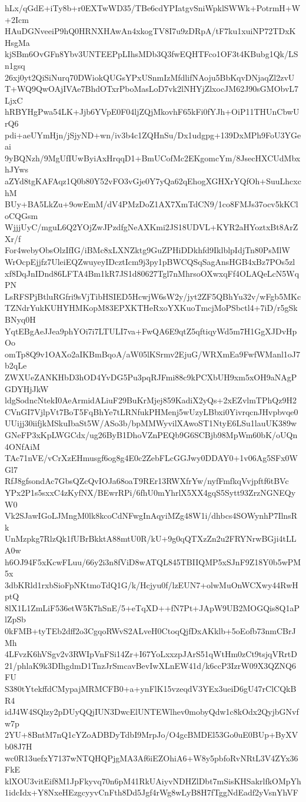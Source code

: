 hLx/qGdE+iTy8b+r0EXTwWD35/TBe6cdYPIatgvSniWpklSWWk+PotrmH+W+2Icm
HAuDGNveeiP9hQ0HRNXHAwAn4xkogTV8I7u9zDRpA/tF7ku1xuiNP72TDxKHsgMa
kjSBm6OvGFn8Ybv3UNTEEPpLIhsMDb3Q3fwEQHTFco1OF3t4KBubg1Qk/LSn1gsq
26xj0yt2QiSiNurq70DWiokQUGsYPxUSnmIzMfdlifNAoju5BbKqvDNjaqZl2zvU
T+WQ9QwOAjIVAe7BhdOTxrPboMasLoD7vk2lNHYjZlxocJM62J90sGMObvL7LjxC
hRBYHgPwa54LK+Jjb6YVpE0F04ljZQjMkovhF65kFi0fYJh+OiP11THUnCbwUrQ6
pdi+aeUYmHjn/jSjyND+wn/iv3b4c1ZQHnSu/Dx1udgpg+139DxMPh9FoU3YGeai
9yBQNzh/9MgUfIUwByiAxHrqqD1+BmUCofMc2EKgomcYm/8JsecHXCUdMbxhJYws
aZYd8tgKAFAqz1Q0b80Y52vFO3vGje0Y7yQa62qEhogXGHXrYQfOh+SuuLhcxchM
BUy+BA5LkZu+9owEmM/dV4PMzDoZ1AX7XmTdCN9/1co8FMJs37ocv5kKCloCQGsm
WjjjUyC/mguL6Q2YOjZwJPzdfgNeAXKmi2JS18UDVL+KYR2aHYoztxBt8ArZXr/f
For4webyObsOlzIfIG/iBMc8xLXNZktg9GuZPHiDDkhfd9IklblpIdjTn80PsMlW
WrOcpEjjfz7UleiEQZwuyeyIDcztIcm9j3py1pBWCQSqSagAnsHGB4xBz7POs5zl
xf8DqJnIDnd86LFTA4Bm1kR7JS1d80627Tgl7nMhrsoOXwxqFf4OLAQeLcN5WqPN
LsRFSPjBtluRGfri9sVjTibHSIED5HcwjW6sW2y/jyt2ZF5QBhYu32v/wFgb5MKc
TZNdrYukKUHYHMKopM83EPXKTHeRxoYXKuoTmcjMoPSbctl4+7iD/r5gSkBNyq0H
YqtEBgAeJJea9phYOi7i7LTULI7va+FwQA6E9qtZ5qftiqyWd5m7H1GgXJDvHpOo
omTp8Q9v1OAXo2aIKBmBqoA/aW05lKSrmv2EjuG/WRXmEa9FwfWManl1oJ7b2qLe
ZWXUeZANKHbD3hOD4YvDG5Pu3pqRJFmi88c9kPCXbUH9xm5xOH9aNAgPGDYHjJkW
ldgSodncNtekI0AeArmidALiuF29BuKrMjej859KadiX2yQs+2xEZvlmTPhQz9H2
CVnGI7VjlpVt7BoT5FqBhYe7tLRNfukPHMenj5wUzyLBbxi0YivrqcnJHvpbvqe0
UUijj30iifjkMSkuIbaSt5W/ASo3b/bpMMWyvilXAwoST1NtyE6LSu1lauUK389w
GNeFP3xKpLWGCdx/ug26ByB1DhoVZnPEQb9G6SCBjb98MpWm60bK/oUQn4ONfAiM
TAc71nVE/vCrXzEHmusgf6og8g4E0c2ZebFLcGGJwy0DDAY0+1v06Ag5SFx0WGl7
RfJ8gfsondAc7GbsQZcQvIOJa68oaT9REr13RWXfrYw/nyfFmfkqVvjpftf6tBVc
YPx2P1s5sxxC4zKyfNX/BEwrRPi/6fhU0mYhrlX5XX4gqS5Sytt93ZrzNGNEQyW0
Vk2SJawIGoLJMngM0lk8kcoCdNFwgInAqyiMZg48W1i/dhbcs4SOWynhP7IlnsRk
UnMzpkg7RlzQk1fUBrBkktA88mtU0R/kU+9g0qQTXzZn2u2FRYNrwBGji4tLLA0w
h6OJ94F5xKcwFLuu/66y2i3n8fViD8wATQL845TBIIQMP5xSJnF9Z18Y0b5wPM5x
3dbKRld1rxbSioFpNKtmoTdQ1G/k/Hcjyu0f/lzEUN7+olwMuOnWCXwy44RwHptQ
8lX1L1ZmLiF536etW5K7hSnE/5+eTqXD++fN7Pt+JApW9UB2MOGQis8Q1aPlZpSb
0kFMB+tyTEb2dff2o3CgqoRWvS2ALveH0CtoqQjfDxAKklb+5oEofb73nmCBrJMh
4LFvzK6hVSgv2v3RWIpVnFSi14Zr+I67YoLxxzpJArS51qWtHm0zCt9tsjqVRrtD
21/phlaK9k3DIhgdmD1TnzJrSmcavBevIwXLnEW41d/k6ccP3IzrW09X3QZNQ6FU
S380tYtekffdCMypajMRMCFB0+a+ynFlK15vzeqdV3YEx3ueiD6gU47rClCQkBR4
idJ4W4SQlzy2pDUyQQjIUN3DwcElUNTEWlhev0mobyQdw1c8kOdx2QyjbGNvfw7p
2YU+8BntM7nQ1cYZoADBDyTdbI9MrpJo/O4gcBMDEl53Go0uE0BUp+ByXVb08J7H
wc0R13uefxY7137wNTQHQPjgMA3Af6iEZOhiA6+W8y5pbfoRvNRtL3V4ZYx36FkE
klXOU3vitEif8M1JpFkyvq70n6pM41RkUAiyvNDHZlDbt7mSisKHSakrlfkOMpYh
1idcIdx+Y8NxeHEzgcyyvCnFth8Dd5Jgf4rWg8wLyB8H7fTggNdEadf2yVsnYhVF
